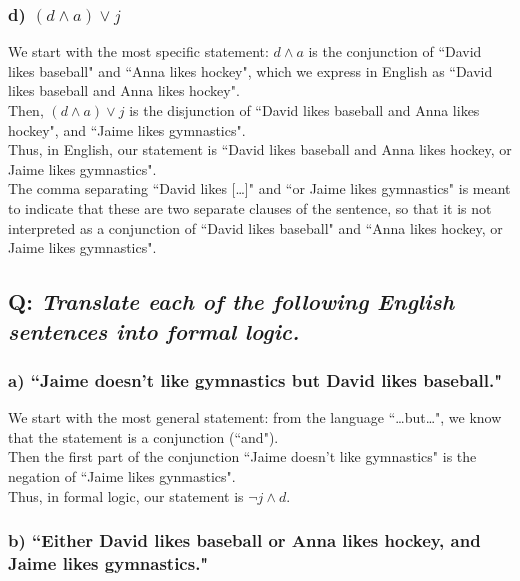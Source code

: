 \documentclass{article}
\begin{document}
\subsubsection*{d) $(d\wedge a)\vee j$}
We start with the most specific statement: $d\wedge a$ is the conjunction of ``David likes baseball" and ``Anna likes hockey", which we express in English as ``David likes baseball and Anna likes hockey".\\[1ex]
Then, $(d\wedge a)\vee j$ is the disjunction of ``David likes baseball and Anna likes hockey", and ``Jaime likes gymnastics".\\[1ex]
Thus, in English, our statement is ``David likes baseball and Anna likes hockey, or Jaime likes gymnastics".\\
The comma separating ``David likes [\ldots]" and ``or Jaime likes gymnastics" is meant to indicate that these are two separate clauses of the sentence, so that it is not interpreted as a conjunction of ``David likes baseball" and ``Anna likes hockey, or Jaime likes gymnastics".

\subsection*{Q: {\em Translate each of the following English sentences into formal logic.}}
\subsubsection*{a) ``Jaime doesn't like gymnastics but David likes baseball."}

We start with the most general statement: from the language ``\ldots but\ldots", we know that the statement is a conjunction (``and").\\[1ex]
Then the first part of the conjunction ``Jaime doesn't like gymnastics" is the negation of ``Jaime likes gynmastics".\\[1ex]
Thus, in formal logic, our statement is $\neg j\wedge d$.

\subsubsection*{b) ``Either David likes baseball or Anna likes hockey, and Jaime likes gymnastics."}
\end{document}
